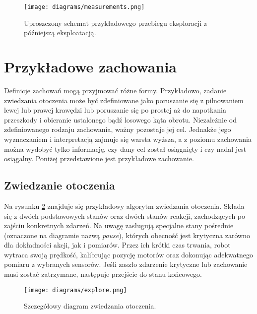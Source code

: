 \begin{figure}[!ht]
    \centering
        \texttt{[image: diagrams/measurements.png]}
    \caption{Uproszczony schemat przykładowego przebiegu eksploracji z późniejszą eksploatacją.\label{fig:measurements}}
\end{figure}

\section{Przykładowe zachowania}

Definicje zachowań mogą przyjmować różne formy. Przykładowo, zadanie zwiedzania otoczenia może być zdefiniowane jako poruszanie się z pilnowaniem lewej lub prawej krawędzi lub poruszanie się po prostej aż do napotkania przeszkody i obieranie ustalonego bądź losowego kąta obrotu. Niezależnie od zdefiniowanego rodzaju zachowania, ważny pozostaje jej cel. Jednakże jego wyznaczaniem i interpretacją zajmuje się warsta wyższa, a z poziomu zachowania można wydobyć tylko informację, czy dany cel został osiągnięty i czy nadal jest osiągalny. Poniżej przedstawione jest przykładowe zachowanie.

\subsection{Zwiedzanie otoczenia}

Na rysunku \ref{fig:explore} znajduje się przykładowy algorytm zwiedzania otoczenia. Składa się z dwóch podstawowych stanów oraz dwóch stanów reakcji, zachodzących po zajściu konkretnych zdarzeń. Na uwagę zasługują specjalne stany pośrednie (oznaczone na diagramie nazwą \textit{pause}), których obecność jest krytyczna zarówno dla dokładności akcji, jak i pomiarów. Przez ich krótki czas trwania, robot wytraca swoją prędkość, kalibrując pozycję motorów oraz dokonując adekwatnego pomiaru z wybranych sensorów. Jeśli zaszło zdarzenie krytyczne lub zachowanie musi zostać zatrzymane, następuje przejście do stanu końcowego.

\begin{figure}[!ht]
    \centering
        \texttt{[image: diagrams/explore.png]}
    \caption{Szczegółowy diagram zwiedzania otoczenia.\label{fig:explore}}
\end{figure}
